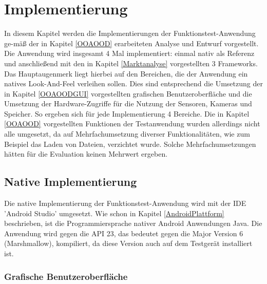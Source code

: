 \chapter{Implementierung}

In diesem Kapitel werden die Implementierungen der Funktionstest-Anwendung ge-mäß der in Kapitel \ref{OOAOOD} erarbeiteten Analyse und Entwurf vorgestellt. Die Anwendung wird insgesamt 4 Mal implementiert: einmal nativ als Referenz und anschließend mit den in Kapitel \ref{Marktanalyse}  vorgestellten 3 Frameworks. Das Hauptaugenmerk liegt hierbei auf den Bereichen, die der Anwendung ein natives Look-And-Feel verleihen sollen. Dies sind entsprechend die Umsetzung der in Kapitel \ref{OOAOODGUI} vorgestellten grafischen Benutzeroberfläche und die Umsetzung der Hardware-Zugriffe für die Nutzung der Sensoren, Kameras und Speicher. So ergeben sich für jede Implementierung 4 Bereiche. Die in Kapitel \ref{OOAOOD} vorgestellten Funktionen der Testanwendung wurden allerdings nicht alle umgesetzt, da auf Mehrfachumsetzung diverser Funktionalitäten, wie zum Beispiel das Laden von Dateien, verzichtet wurde. Solche Mehrfachumsetzungen hätten für die Evaluation keinen Mehrwert ergeben. 

\section{Native Implementierung}

Die native Implementierung der Funktionstest-Anwendung wird mit der IDE 'Android Studio' umgesetzt. Wie schon in Kapitel \ref{AndroidPlattform} beschrieben, ist die Programmiersprache nativer Android Anwendungen Java. Die Anwendung wird gegen die API 23, das bedeutet gegen die Major Version 6 (Marshmallow), kompiliert, da diese Version auch auf dem Testgerät installiert ist. 

\subsection*{Grafische Benutzeroberfläche} \label{natImplGUI}

